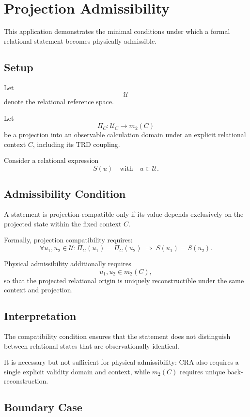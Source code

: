 \section{Projection Admissibility}

This application demonstrates the minimal conditions under which
a formal relational statement becomes physically admissible.

\subsection{Setup}

Let
\[
\mathcal{U}
\]
denote the relational reference space.

Let
\[
\Pi_C : \mathcal{U}_C \rightarrow m_2(C)
\]
be a projection into an observable calculation domain under an explicit
relational context $C$, including its TRD coupling.

Consider a relational expression
\[
S(u)
\quad\text{with}\quad
u \in \mathcal{U}.
\]

\subsection{Admissibility Condition}

A statement is projection-compatible only if its value depends exclusively
on the projected state within the fixed context $C$.

Formally, projection compatibility requires:
\[
\forall u_1,u_2 \in \mathcal{U} :
\Pi_C(u_1) = \Pi_C(u_2)
\;\Rightarrow\;
S(u_1) = S(u_2).
\]

Physical admissibility additionally requires
\[
u_1,u_2 \in m_2(C),
\]
so that the projected relational origin is uniquely reconstructible
under the same context and projection.

\subsection{Interpretation}

The compatibility condition ensures that the statement does not distinguish
between relational states that are observationally identical.

It is necessary but not sufficient for physical admissibility:
CRA also requires a single explicit validity domain and context,
while $m_2(C)$ requires unique back-reconstruction.

\subsection{Boundary Case}

